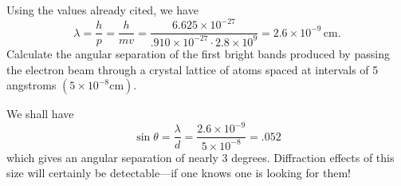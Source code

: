 Using the values already cited, we have
\begin{equation*}
\lambda = \frac{h}{p} = \frac{h}{mv} = 
\frac{6.625\!\times\!10^{-27}}{.910\!\times\!10^{-27}\cdot2.8\!\times\!10^9}
=2.6\!\times\!10^{-9}\, \text{cm}.
\end{equation*}
Calculate the angular separation of the first bright bands produced by
passing the electron beam through a crystal lattice of atoms spaced at
intervals of 5 angstroms $(5\!\times\!10^{-8} \text{cm})$.

We shall have
\begin{equation*}
\sin{\theta}=\frac{\lambda}{d}=\frac{2.6\!\times\!10^{-9}}{5\!\times\!10^{-8}}
= .052
\end{equation*}
which gives an angular separation of nearly 3 degrees. Diffraction
effects of this size will certainly be detectable---if one knows one is
looking for them!
